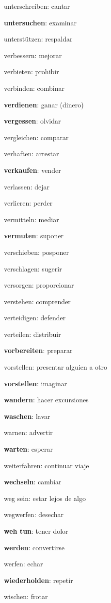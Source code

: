 \begin{multicols}{2}
\begin{myitemize}
\item unterschreiben: cantar
\item \textbf{untersuchen}: examinar
\item unterstützen: respaldar
\item verbessern: mejorar
\item verbieten: prohibir
\item verbinden: combinar
\item \textbf{verdienen}: ganar (dinero)
\item \textbf{vergessen}: olvidar
\item vergleichen: comparar
\item verhaften: arrestar
\item \textbf{verkaufen}: vender
\item verlassen: dejar
\item verlieren: perder
\item vermitteln: mediar
\item \textbf{vermuten}: suponer
\item verschieben: posponer
\item verschlagen: sugerir
\item versorgen: proporcionar
\item verstehen: comprender
\item verteidigen: defender
\item verteilen: distribuir
\item \textbf{vorbereiten}: preparar
\item vorstellen: presentar alguien a otro
\item \textbf{vorstellen}: imaginar
\item \textbf{wandern}: hacer excursiones
\item \textbf{waschen}: lavar
\item warnen: advertir
\item \textbf{warten}: esperar
\item weiterfahren: continuar viaje
\item \textbf{wechseln}: cambiar
\item weg sein: estar lejos de algo
\item wegwerfen: desechar
\item \textbf{weh tun}: tener dolor
\item \textbf{werden}: convertirse
\item werfen: echar
\item \textbf{wiederholden}: repetir
\item wischen: frotar

\end{myitemize}
\end{multicols}
